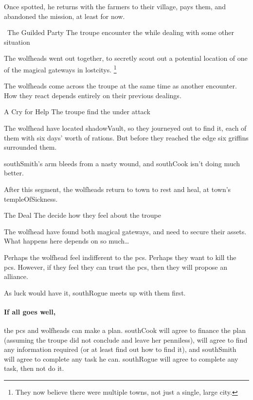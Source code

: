 Once spotted, he returns with the farmers to their \gls{village}, pays them, and abandoned the mission, at least for now.

{\squash~The Guilded Party}%
{The troupe encounter the  while dealing with some other situation}%

\begin{exampletext}
  The \glspl{wolfhead} went out together, to secretly scout out a potential location of one of the magical gateways in \glspl{lostcity}.%
  \footnote{They now believe there were multiple towns, not just a single, large city.}
\end{exampletext}

The \glspl{wolfhead} come across the troupe at the same time as another encounter.
How they react depends entirely on their previous dealings.

{A Cry for Help}%
{The troupe find the  under attack}%

The \gls{wolfhead} have located \gls{shadowVault}, so they journeyed out to find it, each of them with six days' worth of rations.
But before they reached the \gls{edge} six griffins surrounded them.

\Gls{southSmith}'s arm bleeds from a nasty wound, and \gls{southCook} isn't doing much better.

\setcounter{wounds}{3}
\southCook

After this \gls{segment}, the \glspl{wolfhead} return to \gls{town} to rest and heal, at \gls{town}'s \gls{templeOfSickness}.


{The Deal}%
{The  decide how they feel about the troupe}%

The \gls{wolfhead} have found both magical gateways, and need to secure their assets.
What happens here depends on so much\ldots

Perhaps the \gls{wolfhead} feel indifferent to the \glspl{pc}.
Perhaps they want to kill the \glspl{pc}.
However, if they feel they can trust the \glspl{pc}, then they will propose an alliance.

As luck would have it, \gls{southRogue} meets up with them first.

\paragraph{If all goes well,}
the \glspl{pc} and \glspl{wolfhead} can make a plan.
\Gls{southCook} will agree to finance the plan (assuming the troupe did not conclude  and leave her penniless),  will agree to find any information required (or at least find out how to find it), and \gls{southSmith} will agree to complete any task he can.
\Gls{southRogue} will agree to complete any task, then not do it.

